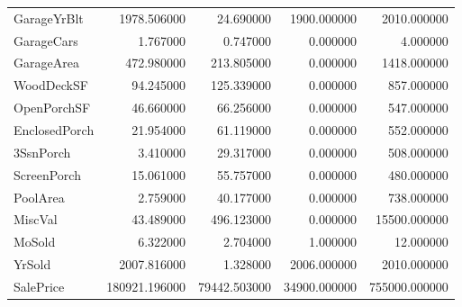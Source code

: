 \begin{tabular}{lrrrr}
GarageYrBlt & 1978.506000 & 24.690000 & 1900.000000 & 2010.000000 \\
GarageCars & 1.767000 & 0.747000 & 0.000000 & 4.000000 \\
GarageArea & 472.980000 & 213.805000 & 0.000000 & 1418.000000 \\
WoodDeckSF & 94.245000 & 125.339000 & 0.000000 & 857.000000 \\
OpenPorchSF & 46.660000 & 66.256000 & 0.000000 & 547.000000 \\
EnclosedPorch & 21.954000 & 61.119000 & 0.000000 & 552.000000 \\
3SsnPorch & 3.410000 & 29.317000 & 0.000000 & 508.000000 \\
ScreenPorch & 15.061000 & 55.757000 & 0.000000 & 480.000000 \\
PoolArea & 2.759000 & 40.177000 & 0.000000 & 738.000000 \\
MiscVal & 43.489000 & 496.123000 & 0.000000 & 15500.000000 \\
MoSold & 6.322000 & 2.704000 & 1.000000 & 12.000000 \\
YrSold & 2007.816000 & 1.328000 & 2006.000000 & 2010.000000 \\
SalePrice & 180921.196000 & 79442.503000 & 34900.000000 & 755000.000000 \\
\bottomrule
\end{tabular}
